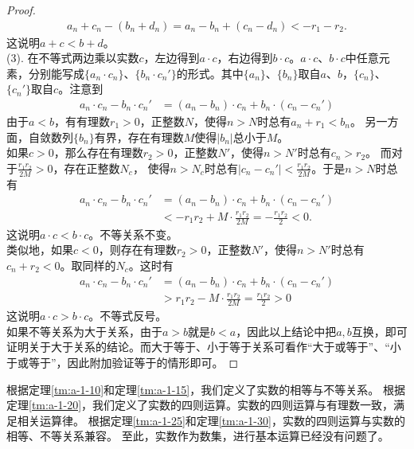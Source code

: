 \documentclass[12pt,UTF8]{ctexbook}
\begin{document}
\begin{appendix}
\begin{proof}
    \begin{align*}
        a_n + c_n-(b_n + d_n) = a_n - b_n +  (c_n - d_n) < -r_1 - r_2 .
    \end{align*}
    这说明$a + c < b + d$。\\
    (3). 在不等式两边乘以实数$c$，左边得到$a\cdot c$，右边得到$b\cdot c$。$a\cdot c$、$b\cdot c$中任意元素，分别能写成$\{a_n\cdot c_n\}$、$\{b_n\cdot c_n'\}$的形式。其中$\{a_n\}$、$\{b_n\}$取自$a$、$b$，$\{c_n\}$、$\{c_n'\}$取自$c$。注意到
    \begin{align*}
        a_n\cdot c_n - b_n\cdot c_n' &= (a_n - b_n)\cdot c_n + b_n\cdot(c_n - c_n')  
    \end{align*}
    由于$a< b$，有有理数$r_1>0$，正整数$N$，使得$n>N$时总有$a_n + r_1 < b_n$。
    另一方面，自敛数列$\{b_n\}$有界，存在有理数$M$使得$|b_n|$总小于$M$。\\
    如果$c > 0$，那么存在有理数$r_2>0$，正整数$N'$，使得$n>N'$时总有$c_n > r_2$。
    而对于$\frac{r_1r_2}{2M}>0$，存在正整数$N_c$，
    使得$n>N_c$时总有$|c_n - c_n'| < \frac{r_1r_2}{2M}$。于是$n>N$时总有
    \begin{align*}
        a_n\cdot c_n - b_n\cdot c_n' &= (a_n - b_n)\cdot c_n + b_n\cdot(c_n - c_n')  \\
        &< -r_1r_2 + M\cdot\frac{r_1r_2}{2M} = -\frac{r_1r_2}{2} < 0 .
    \end{align*}
    这说明$a\cdot c < b\cdot c$。不等关系不变。\\
    类似地，如果$c < 0$，则存在有理数$r_2>0$，正整数$N'$，使得$n>N'$时总有$c_n + r_2 < 0$。取同样的$N_c$。这时有
    \begin{align*}
        a_n\cdot c_n - b_n\cdot c_n' &= (a_n - b_n)\cdot c_n + b_n\cdot(c_n - c_n')  \\
        &> r_1r_2 - M\cdot\frac{r_1r_2}{2M} = \frac{r_1r_2}{2} > 0 
    \end{align*}
    这说明$a\cdot c > b\cdot c$。不等式反号。\\
    如果不等关系为大于关系，由于$a>b$就是$b<a$，因此以上结论中把$a,b$互换，即可证明关于大于关系的结论。而大于等于、小于等于关系可看作“大于或等于”、“小于或等于”，因此附加验证等于的情形即可。  
\end{proof}

根据定理\ref{tm:a-1-10}和定理\ref{tm:a-1-15}，我们定义了实数的相等与不等关系。
根据定理\ref{tm:a-1-20}，我们定义了实数的四则运算。实数的四则运算与有理数一致，满足相关运算律。
根据定理\ref{tm:a-1-25}和定理\ref{tm:a-1-30}，实数的四则运算与实数的相等、不等关系兼容。
至此，实数作为数集，进行基本运算已经没有问题了。


\end{appendix}
\end{document}
